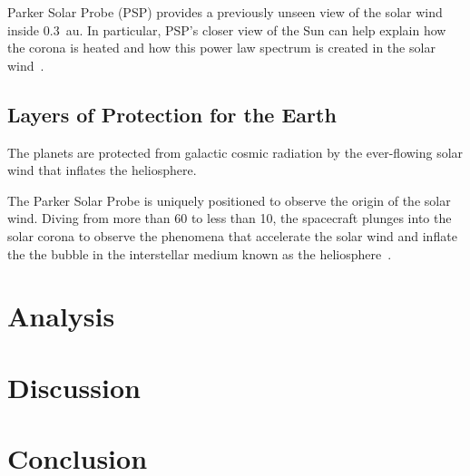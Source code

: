 \documentclass[letterpaper,11pt]{article}
\begin{document}
Parker Solar Probe (PSP) provides a previously unseen view of the solar wind inside \SI{0.3}{\astronomicalunit}.  In particular, PSP's closer view of the Sun can help explain how the corona is heated and how this power law spectrum is created in the solar wind~\citep{McComas2007}.

\subsection{Layers of Protection for the Earth}
The planets are protected from galactic cosmic radiation by the ever-flowing solar wind that inflates the heliosphere.  

The Parker Solar Probe is uniquely positioned to observe the origin of the solar wind.  Diving from more than 60 to less than \SI{10}{\solarradius}, the spacecraft plunges into the solar corona to observe the phenomena that accelerate the solar wind and inflate the the bubble in the interstellar medium known as the heliosphere~\citep{McComas2014}.



\section{Analysis}
\label{sec:analysis}


\section{Discussion}
\label{sec:discussion}



\section{Conclusion}
\label{sec:conclusion}





\end{document}
